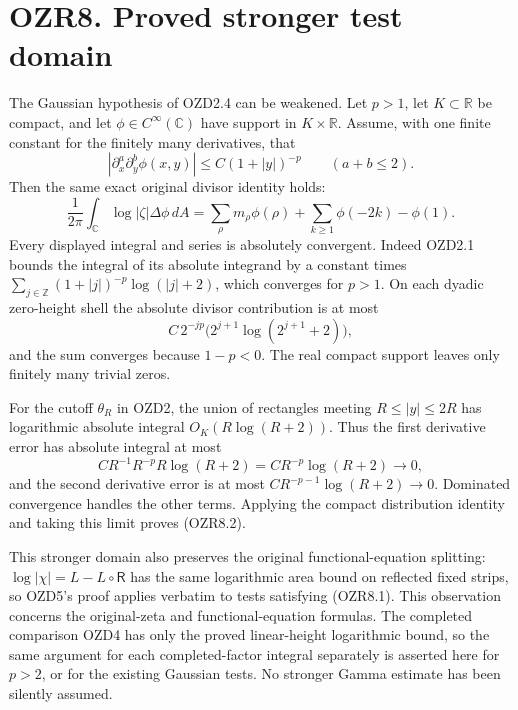 \section{OZR8. Proved stronger test
domain}\label{ozr8.-proved-stronger-test-domain}

The Gaussian hypothesis of OZD2.4 can be weakened. Let \(p>1\), let
\(K\subset\mathbb R\) be compact, and let
\(\phi\in C^\infty(\mathbb C)\) have support in \(K\times\mathbb R\).
Assume, with one finite constant for the finitely many derivatives, that
\[
|\partial_x^a\partial_y^b\phi(x,y)|
\le C(1+|y|)^{-p}\qquad(a+b\le2).
\tag{OZR8.1}
\] Then the same exact original divisor identity holds: \[
\frac1{2\pi}\int_{\mathbb C}\log|\zeta|\Delta\phi\,dA
=\sum_\rho m_\rho\phi(\rho)+\sum_{k\ge1}\phi(-2k)-\phi(1).
\tag{OZR8.2}
\] Every displayed integral and series is absolutely convergent. Indeed
OZD2.1 bounds the integral of its absolute integrand by a constant times
\(\sum_{j\in\mathbb Z}(1+|j|)^{-p}\log(|j|+2)\), which converges for
\(p>1\). On each dyadic zero-height shell the absolute divisor
contribution is at most \[
C\,2^{-jp}\bigl(2^{j+1}\log(2^{j+1}+2)\bigr),
\] and the sum converges because \(1-p<0\). The real compact support
leaves only finitely many trivial zeros.

For the cutoff \(\theta_R\) in OZD2, the union of rectangles meeting
\(R\le|y|\le2R\) has logarithmic absolute integral \(O_K(R\log(R+2))\).
Thus the first derivative error has absolute integral at most \[
C R^{-1}R^{-p}R\log(R+2)=C R^{-p}\log(R+2)\longrightarrow0,
\] and the second derivative error is at most
\(C R^{-p-1}\log(R+2)\to0\). Dominated convergence handles the other
terms. Applying the compact distribution identity and taking this limit
proves (OZR8.2).

This stronger domain also preserves the original functional-equation
splitting: \(\log|\chi|=L-L\circ\mathsf R\) has the same logarithmic
area bound on reflected fixed strips, so OZD5's proof applies verbatim
to tests satisfying (OZR8.1). This observation concerns the
original-zeta and functional-equation formulas. The completed comparison
OZD4 has only the proved linear-height logarithmic bound, so the same
argument for each completed-factor integral separately is asserted here
for \(p>2\), or for the existing Gaussian tests. No stronger Gamma
estimate has been silently assumed.

